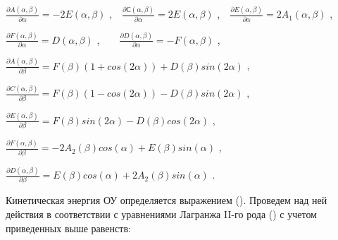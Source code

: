 \( \frac{ \partial A \left(  \alpha , \beta  \right) }{ \partial  \alpha }=-2E \left(  \alpha , \beta  \right)  \) ,\ \   \( \frac{ \partial С \left(  \alpha , \beta  \right) }{ \partial  \alpha }=2E \left(  \alpha , \beta  \right)  \) ,\ \   \( \frac{ \partial E \left(  \alpha , \beta  \right) }{ \partial  \alpha }=2A_{1} \left(  \alpha , \beta  \right)  \) ,\par

\( \frac{ \partial F \left(  \alpha , \beta  \right) }{ \partial  \alpha }=D \left(  \alpha , \beta  \right)  \) ,\ \ \ \   \( \frac{ \partial D \left(  \alpha , \beta  \right) }{ \partial  \alpha }=-F \left(  \alpha , \beta  \right)  \) ,\par

\( \frac{ \partial A \left(  \alpha , \beta  \right) }{ \partial  \beta }=F \left(  \beta  \right)  \left( 1+cos \left( 2 \alpha  \right)  \right) +D \left(  \beta  \right) sin \left( 2 \alpha  \right)  \) ,\par

\( \frac{ \partial C \left(  \alpha , \beta  \right) }{ \partial  \beta }=F \left(  \beta  \right)  \left( 1-cos \left( 2 \alpha  \right)  \right) -D \left(  \beta  \right) sin \left( 2 \alpha  \right)  \) ,\par

\( \frac{ \partial E \left(  \alpha , \beta  \right) }{ \partial  \beta }=F \left(  \beta  \right) sin \left( 2 \alpha  \right) -D \left(  \beta  \right) cos \left( 2 \alpha  \right)  \) ,\par

\( \frac{ \partial F \left(  \alpha , \beta  \right) }{ \partial  \beta }=-2A_{2} \left(  \beta  \right) cos \left(  \alpha  \right) +E \left(  \beta  \right) sin \left(  \alpha  \right)  \) ,\par

\( \frac{ \partial D \left(  \alpha , \beta  \right) }{ \partial  \beta }=E \left(  \beta  \right) cos \left(  \alpha  \right) +2A_{2} \left(  \beta  \right) sin \left(  \alpha  \right)  \) .\par

Кинетическая энергия ОУ определяется выражением (). Проведем над ней действия в соответствии с уравнениями Лагранжа II-го рода () с учетом приведенных выше равенств:\par

